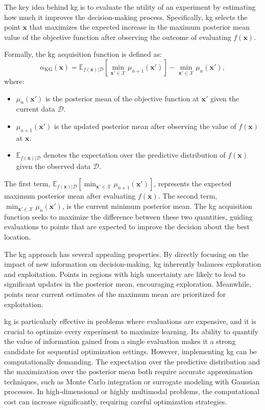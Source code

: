 The key idea behind \ac{kg} is to evaluate the utility of an experiment by estimating how much it improves the decision-making process. Specifically, \ac{kg} selects the point $\mathbf{x}$ that maximizes the expected increase in the maximum posterior mean value of the objective function after observing the outcome of evaluating $f(\mathbf{x})$. 

Formally, the \ac{kg} acquisition function is defined as:
\begin{equation}
    \alpha_{\text{KG}}(\mathbf{x}) = \mathbb{E}_{f(\mathbf{x})|\mathcal{D}} \left[ \min_{\mathbf{x}' \in \mathcal{X}} \mu_{n+1}(\mathbf{x}') \right] - \min_{\mathbf{x}' \in \mathcal{X}} \mu_n(\mathbf{x}'),
\end{equation}
where:
\begin{itemize}
    \item $\mu_n(\mathbf{x}')$ is the posterior mean of the objective function at $\mathbf{x}'$ given the current data $\mathcal{D}$.
    \item $\mu_{n+1}(\mathbf{x}')$ is the updated posterior mean after observing the value of $f(\mathbf{x})$ at $\mathbf{x}$.
    \item $\mathbb{E}_{f(\mathbf{x})|\mathcal{D}}$ denotes the expectation over the predictive distribution of $f(\mathbf{x})$ given the observed data $\mathcal{D}$.
\end{itemize}

The first term, $\mathbb{E}_{f(\mathbf{x})|\mathcal{D}} \left[ \min_{\mathbf{x}' \in \mathcal{X}} \mu_{n+1}(\mathbf{x}') \right]$, represents the expected maximum posterior mean after evaluating $f(\mathbf{x})$. The second term, $\min_{\mathbf{x}' \in \mathcal{X}} \mu_n(\mathbf{x}')$, is the current minimum posterior mean. The \ac{kg} acquisition function seeks to maximize the difference between these two quantities, guiding evaluations to points that are expected to improve the decision about the best location.

The \ac{kg} approach has several appealing properties. By directly focusing on the impact of new information on decision-making, \ac{kg} inherently balances exploration and exploitation. Points in regions with high uncertainty are likely to lead to significant updates in the posterior mean, encouraging exploration. Meanwhile, points near current estimates of the maximum mean are prioritized for exploitation.

\ac{kg} is particularly effective in problems where evaluations are expensive, and it is crucial to optimize every experiment to maximize learning. Its ability to quantify the value of information gained from a single evaluation makes it a strong candidate for sequential optimization settings. However, implementing \ac{kg} can be computationally demanding. The expectation over the predictive distribution and the maximization over the posterior mean both require accurate approximation techniques, such as Monte Carlo integration or surrogate modeling with Gaussian processes. In high-dimensional or highly multimodal problems, the computational cost can increase significantly, requiring careful optimization strategies.

